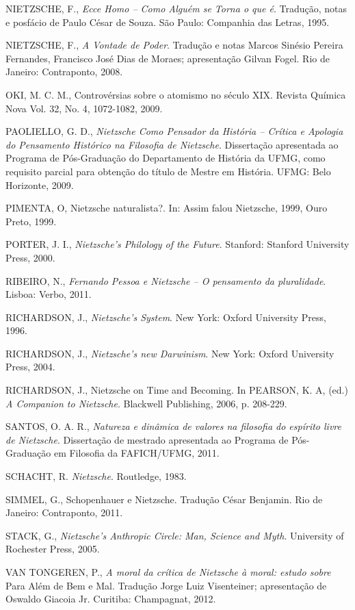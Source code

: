 \documentclass[
	12pt,				%
	openright,			%
	oneside,			%
	a4paper,			%
	english,			%
	french,				%
	spanish,			%
	brazil				%
	]{abntex2}
\begin{document}
NIETZSCHE, F., \textit{Ecce Homo – Como Alguém se Torna o que é}. Tradução, notas e posfácio de Paulo César de Souza. São Paulo: Companhia das Letras, 1995.

NIETZSCHE, F., \textit{A Vontade de Poder}. Tradução e notas Marcos Sinésio Pereira Fernandes, Francisco José Dias de Moraes; apresentação Gilvan Fogel. Rio de Janeiro: Contraponto, 2008.

OKI, M. C. M., Controvérsias sobre o atomismo no século XIX. Revista Química Nova Vol. 32, No. 4, 1072-1082, 2009.

PAOLIELLO, G. D., \textit{Nietzsche Como Pensador da História – Crítica e Apologia do Pensamento Histórico na Filosofia de Nietzsche}. Dissertação apresentada ao Programa de Pós-Graduação do Departamento de História da UFMG, como requisito parcial para obtenção do título de Mestre em História. UFMG: Belo Horizonte, 2009.

PIMENTA, O,  Nietzsche naturalista?. In: Assim falou Nietzsche, 1999, Ouro Preto, 1999. 

PORTER, J. I., \textit{Nietzsche's Philology of the Future}. Stanford: Stanford University Press, 2000.

RIBEIRO, N., \textit{Fernando Pessoa e Nietzsche – O pensamento da pluralidade}. Lisboa: Verbo, 2011.

RICHARDSON, J., \textit{Nietzsche's System}. New York: Oxford University Press, 1996.

RICHARDSON, J., \textit{Nietzsche's new Darwinism}. New York: Oxford University Press, 2004.

RICHARDSON, J., Nietzsche on Time and Becoming. In PEARSON, K. A, (ed.) \textit{A Companion to Nietzsche}. Blackwell Publishing, 2006, p. 208-229. 

SANTOS, O. A. R., \textit{Natureza e dinâmica de valores na filosofia do espírito livre de Nietzsche}. Dissertação de mestrado apresentada ao Programa de Pós-Graduação em Filosofia da FAFICH/UFMG, 2011.

SCHACHT, R. \textit{Nietzsche}. Routledge, 1983.

SIMMEL, G., Schopenhauer e Nietzsche. Tradução César Benjamin. Rio de Janeiro: Contraponto, 2011.

STACK, G., \textit{Nietzsche's Anthropic Circle: Man, Science and Myth}. University of Rochester Press, 2005.

VAN TONGEREN, P., \textit{A moral da crítica de Nietzsche à moral: estudo sobre} Para Além de Bem e Mal. Tradução Jorge Luiz Visenteiner; apresentação de Oswaldo Giacoia Jr. Curitiba: Champagnat, 2012.

\postextual


\end{document}
